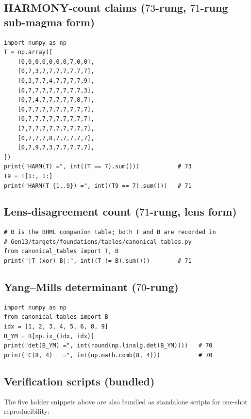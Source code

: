 \documentclass[11pt,reqno]{amsart}
\theoremstyle{definition}
\begin{document}
\subsection{HARMONY-count claims ($73$-rung, $71$-rung sub-magma form)}
\label{subsec:harm-snippet}

\begin{lstlisting}[style=plainpy]
import numpy as np
T = np.array([
    [0,0,0,0,0,0,0,7,0,0],
    [0,7,3,7,7,7,7,7,7,7],
    [0,3,7,7,4,7,7,7,7,9],
    [0,7,7,7,7,7,7,7,7,3],
    [0,7,4,7,7,7,7,7,8,7],
    [0,7,7,7,7,7,7,7,7,7],
    [0,7,7,7,7,7,7,7,7,7],
    [7,7,7,7,7,7,7,7,7,7],
    [0,7,7,7,8,7,7,7,7,7],
    [0,7,9,7,3,7,7,7,7,7],
])
print("HARM(T) =", int((T == 7).sum()))           # 73
T9 = T[1:, 1:]
print("HARM(T_{1..9}) =", int((T9 == 7).sum()))   # 71
\end{lstlisting}

\subsection{Lens-disagreement count ($71$-rung, lens form)}
\label{subsec:lens-snippet}

\begin{lstlisting}[style=plainpy]
# B is the BHML companion table; both T and B are recorded in
# Gen13/targets/foundations/tables/canonical_tables.py
from canonical_tables import T, B
print("|T (xor) B|:", int((T != B).sum()))        # 71
\end{lstlisting}

\subsection{Yang--Mills determinant ($70$-rung)}
\label{subsec:ym-det-snippet}

\begin{lstlisting}[style=plainpy]
import numpy as np
from canonical_tables import B
idx = [1, 2, 3, 4, 5, 6, 8, 9]
B_YM = B[np.ix_(idx, idx)]
print("det(B_YM) =", int(round(np.linalg.det(B_YM))))   # 70
print("C(8, 4)   =", int(np.math.comb(8, 4)))           # 70
\end{lstlisting}

\subsection{Verification scripts (bundled)}

The five ladder snippets above are also bundled as standalone scripts
for one-shot reproducibility:
\end{document}
